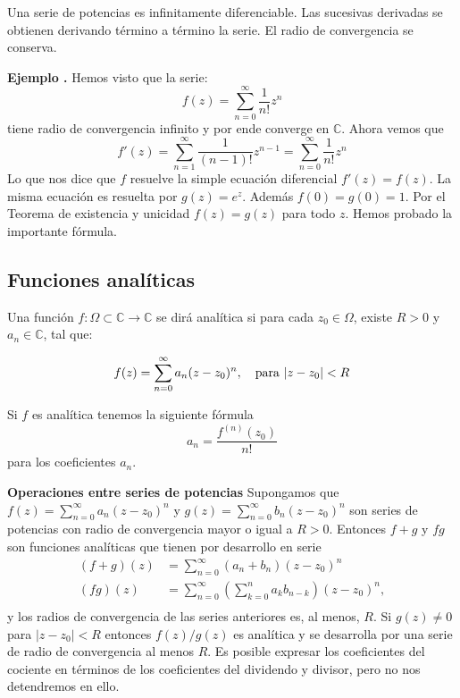 \documentclass{article}
\newcommand{\com}{\mathbb{C}}
\newcounter{ejemplo_cont}
\newenvironment{ejemplo}{\noindent\textbf{Ejemplo  \arabic{ejemplo_cont}.} }{\addtocounter{ejemplo_cont}{1}}
\begin{document}
\begin{corolario}  Una serie de potencias es infinitamente diferenciable. Las sucesivas derivadas se obtienen derivando término a término la serie. El radio de convergencia se conserva.
\end{corolario}

\begin{ejemplo}  Hemos visto que la serie:
\[
	f(z)=\sum_{n=0}^{\infty}\frac{1}{n!}z^n
\]
tiene radio de convergencia infinito y por ende converge en $\com$. Ahora vemos que
\[f'(z)=\sum_{n=1}^{\infty}\frac{1}{(n-1)!}z^{n-1} =\sum_{n=0}^{\infty}\frac{1}{n!}z^n
\]
Lo que nos dice que $f$ resuelve la simple ecuación diferencial $f'(z)=f(z)$. La misma ecuación es resuelta por $g(z)=e^z$. Además $f(0)=g(0)=1$. Por el Teorema de existencia y unicidad $f(z)=g(z)$ para todo $z$. Hemos probado la importante fórmula.
\end{ejemplo}
\subsection{Funciones analíticas}
\begin{definicion} Una función $f:\Omega\subset\com\to\com$ se dirá analítica si para cada $z_0\in\Omega$, existe  $R>0$ y $a_n\in\com$, tal que:

\[ f(z)=\sum_{n=0}^{\infty}a_n(z-z_0)^n,\quad\hbox{para } |z-z_0|<R \]
\end{definicion}


\begin{ejercicio} Si $f$ es analítica tenemos la siguiente fórmula
\[
	a_n=\frac{f^{(n)}(z_0)}{n!}
\]
para los coeficientes $a_n$. 
\end{ejercicio}

 \begin{teorema}\label{teor_oper_series}\textbf{Operaciones entre series de potencias} Supongamos que $f(z)=\sum_{n=0}^{\infty}a_n(z-z_0)^n$ y  $g(z)=\sum_{n=0}^{\infty}b_n(z-z_0)^n$ son series de potencias con radio de convergencia mayor o igual a $R>0$. Entonces $f+g$ y $fg$ son funciones analíticas que tienen por desarrollo en serie
\[
    \begin{split}
      (f+g)(z)&=\sum_{n=0}^{\infty}(a_n+b_n)(z-z_0)^n\\
      (fg)(z)&=\sum_{n=0}^{\infty}\left(\sum_{k=0}^na_kb_{n-k}\right)(z-z_0)^n,\\
    \end{split}
\]
y los radios de convergencia de las series anteriores es, al menos, $R$. Si $g(z)\neq 0$ para $|z-z_0|<R$ entonces $f(z)/g(z)$ es analítica y se desarrolla por  una  serie de radio de convergencia al menos $R$. Es posible expresar los coeficientes del cociente en términos de los coeficientes del dividendo y divisor, pero no nos detendremos en ello.   
\end{teorema}
\end{document}
